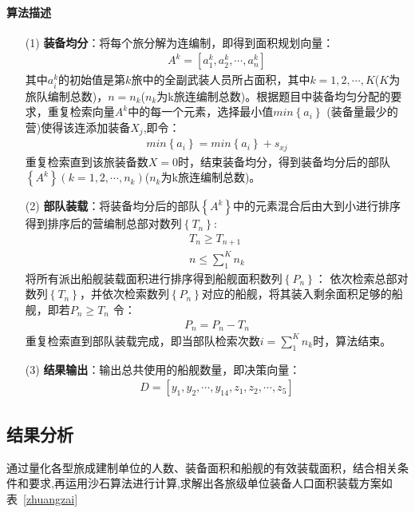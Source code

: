 \documentclass{whutmod}
\begin{document}
	 \paragraph{算法描述}
	 	\begin{itemize}
	 	\item [(1)] \textbf{装备均分}：将每个旅分解为连编制，即得到面积规划向量：
	 \begin{gather*}
	 	A^k=[a^k_{1},a^k_{2},\cdots,a^k_{n}]
	\end{gather*}
	 	其中$a^k_{i}$的初始值是第$k$旅中的全副武装人员所占面积，其中$k=1,2,\cdots,K$($K$为旅队编制总数)，$n=n_{k}$($n_{k}$为k旅连编制总数)。根据题目中装备均匀分配的要求，重复检索向量$A^k$中的每一个元素，选择最小值$min \left \{ a_{i} \right \}$ (装备量最少的营)使得该连添加装备$X_{j}$,即令：
	 	\begin{gather*}
	   min \left \{ a_{i} \right \}=min \left \{ a_{i} \right \}+s_{xj}
	 	\end{gather*}
	 	重复检索直到该旅装备数$X=0$时，结束装备均分，得到装备均分后的部队$ \left \{A^k\right \}(k=1,2,\cdots,n_{k})$($n_{k}$为k旅连编制总数)。
	
		\item [(2)] \textbf{部队装载}：将装备均分后的部队$ \left \{A^k\right \}$中的元素混合后由大到小进行排序得到排序后的营编制总部对数列$ \left \{T_{n}\right \}$:
			\begin{gather*}
	T_{n}\geqslant 	T_{n+1}\\
	n\leq \sum_{1}^{K}n_{k}
		\end{gather*}
		将所有派出船舰装载面积进行排序得到船舰面积数列$ \left \{P_{n}\right \}$：
		依次检索总部对数列$ \left \{T_{n}\right \}$，并依次检索数列$ \left \{P_{n}\right \}$对应的船舰，将其装入剩余面积足够的船舰，即若$P_{n}\geqslant T_{n}$ 令：
		\begin{gather*}
		P_{n}=	P_{n}-	T_{n}
		\end{gather*}
		重复检索直到部队装载完成，即当部队检索次数$i=\sum_{1}^{K}n_{k}$时，算法结束。
		\item [(3)] \textbf{结果输出}：输出总共使用的船舰数量，即决策向量：
		\begin{gather*}
		D=[y_{1},y_{2},\cdots,y_{14},z_{1},z_{2},\cdots,z_{5}]
		\end{gather*}
	\end{itemize}

\subsection{结果分析}
通过量化各型旅成建制单位的人数、装备面积和船舰的有效装载面积，结合相关条件和要求,再运用沙石算法进行计算,求解出各旅级单位装备人口面积装载方案如表~\ref{zhuangzai}~
\end{document}
